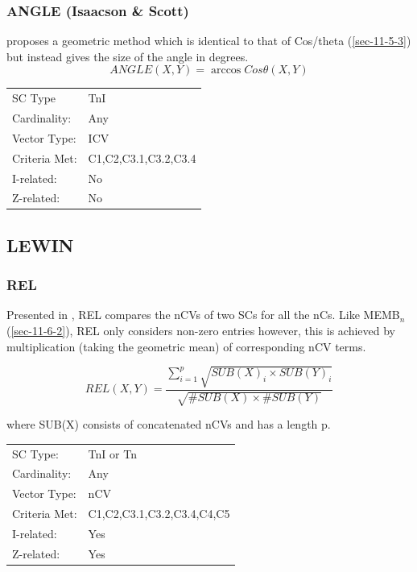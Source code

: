 \documentclass{article}
\begin{document}
\subsubsection{ANGLE (Isaacson \& Scott)}
\label{sec-11-7-4}

\citet{Scott1998} proposes a geometric method which is identical to
that of Cos/theta (\ref{sec-11-5-3}) but instead gives the size of the
angle in degrees. $$ANGLE(X,Y) = \arccos{Cos\theta(X,Y)}$$

\begin{center}
\begin{tabular}{ll}
 SC Type        &  TnI                   \\
 Cardinality:   &  Any                   \\
 Vector Type:   &  ICV                   \\
 Criteria Met:  &  C1,C2,C3.1,C3.2,C3.4  \\
 I-related:     &  No                    \\
 Z-related:     &  No                    \\
\end{tabular}
\end{center}
\subsection{LEWIN}
\label{sec-11-8}
\subsubsection{REL}
\label{sec-11-8-1}

Presented in \citet{Lewin1979}, REL compares the nCVs of two SCs for
all the nCs. Like MEMB$_{n}$ (\ref{sec-11-6-2}), REL only considers non-zero
entries however, this is achieved by multiplication (taking the
geometric mean) of corresponding nCV terms.

$$REL(X,Y)=\frac{\sum_{i=1}^{p}{\sqrt{SUB(X)_{i}\times SUB(Y)_{i}}}}{\sqrt{\#SUB(X)\times \#SUB(Y)}}$$

where SUB(X) consists of concatenated nCVs and has a length p.

\begin{center}
\begin{tabular}{ll}
 SC Type:       &  TnI or Tn                   \\
 Cardinality:   &  Any                         \\
 Vector Type:   &  nCV                         \\
 Criteria Met:  &  C1,C2,C3.1,C3.2,C3.4,C4,C5  \\
 I-related:     &  Yes                         \\
 Z-related:     &  Yes                         \\
\end{tabular}
\end{center}
\end{document}
